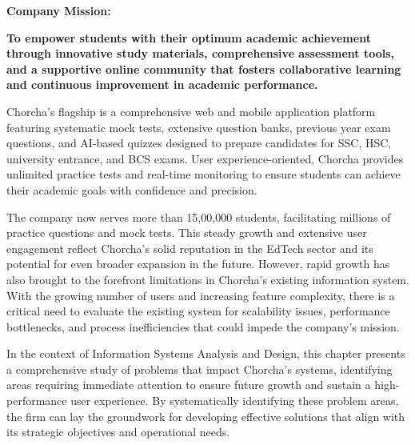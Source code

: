 \documentclass[12pt,a4paper,oneside]{book}
\begin{document}
\vspace{0.5cm}

\textbf{\textcolor{chapterblue}{Company Mission:}} \\
\colorbox{chapterblue!10}{\parbox{0.95\textwidth}{\textcolor{chapterblue}{\textbf{To empower students with their optimum academic achievement through innovative study materials, comprehensive assessment tools, and a supportive online community that fosters collaborative learning and continuous improvement in academic performance.}}}}

\vspace{0.5cm}

Chorcha's flagship is a comprehensive web and mobile application platform featuring systematic mock tests, extensive question banks, previous year exam questions, and AI-based quizzes designed to prepare candidates for SSC, HSC, university entrance, and BCS exams. User experience-oriented, Chorcha provides unlimited practice tests and real-time monitoring to ensure students can achieve their academic goals with confidence and precision.

\begin{tcolorbox}[impactbox, title=Critical Growth Challenge]
The company now serves more than 15,00,000 students, facilitating millions of practice questions and mock tests. This steady growth and extensive user engagement reflect Chorcha's solid reputation in the EdTech sector and its potential for even broader expansion in the future. However, rapid growth has also brought to the forefront limitations in Chorcha's existing information system. With the growing number of users and increasing feature complexity, there is a critical need to evaluate the existing system for scalability issues, performance bottlenecks, and process inefficiencies that could impede the company's mission.
\end{tcolorbox}

\begin{tcolorbox}[infobox, title=Chapter Objective]
In the context of Information Systems Analysis and Design, this chapter presents a comprehensive study of problems that impact Chorcha's systems, identifying areas requiring immediate attention to ensure future growth and sustain a high-performance user experience. By systematically identifying these problem areas, the firm can lay the groundwork for developing effective solutions that align with its strategic objectives and operational needs.
\end{tcolorbox}
\end{document}
